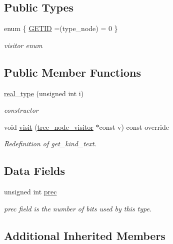 \subsection*{Public Types}
\begin{DoxyCompactItemize}
\item 
enum \{ \hyperlink{structreal__type_a12f30468709eceaa6491d02ced7edcecab33ab90ad121b175037ee24c7c1f1be9}{G\+E\+T\+ID} =(type\+\_\+node) = 0
 \}\begin{DoxyCompactList}\small\item\em visitor enum \end{DoxyCompactList}
\end{DoxyCompactItemize}
\subsection*{Public Member Functions}
\begin{DoxyCompactItemize}
\item 
\hyperlink{structreal__type_a6fa9dbfd07e2f6abdef7c106f3cda19b}{real\+\_\+type} (unsigned int i)
\begin{DoxyCompactList}\small\item\em constructor \end{DoxyCompactList}\item 
void \hyperlink{structreal__type_a9f45291aa61c33e2abba3618ce224dc3}{visit} (\hyperlink{classtree__node__visitor}{tree\+\_\+node\+\_\+visitor} $\ast$const v) const override
\begin{DoxyCompactList}\small\item\em Redefinition of get\+\_\+kind\+\_\+text. \end{DoxyCompactList}\end{DoxyCompactItemize}
\subsection*{Data Fields}
\begin{DoxyCompactItemize}
\item 
unsigned int \hyperlink{structreal__type_a3348202ef122e105a26211dc500431f8}{prec}
\begin{DoxyCompactList}\small\item\em prec field is the number of bits used by this type. \end{DoxyCompactList}\end{DoxyCompactItemize}
\subsection*{Additional Inherited Members}


